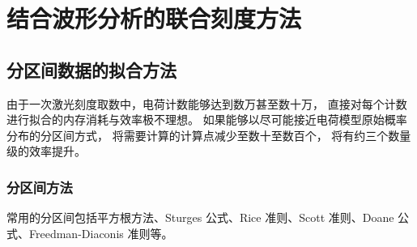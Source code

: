 
\chapter{结合波形分析的联合刻度方法}

\section{分区间数据的拟合方法}
由于一次激光刻度取数中，电荷计数能够达到数万甚至数十万，
直接对每个计数进行拟合的内存消耗与效率极不理想。
如果能够以尽可能接近电荷模型原始概率分布的分区间方式，
将需要计算的计算点减少至数十至数百个，
将有约三个数量级的效率提升。

\subsection{分区间方法}
常用的分区间包括平方根方法、Sturges 公式、Rice 准则、Scott 准则、Doane 公式、Freedman-Diaconis 准则等。

